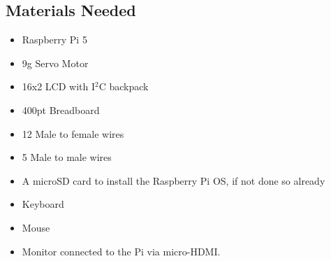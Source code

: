 \documentclass[titlepage]{article}
\begin{document}
\subsection*{Materials Needed}
\begin{itemize}
    \item Raspberry Pi 5
    \item 9g Servo Motor
    \item 16x2 LCD with I$^2$C backpack
    \item 400pt Breadboard
    \item 12 Male to female wires
    \item 5 Male to male wires
    \item A microSD card to install the Raspberry Pi OS, if not done so already
    \item Keyboard
    \item Mouse
    \item Monitor connected to the Pi via micro-HDMI.
\end{itemize}
\medskip
\end{document}
